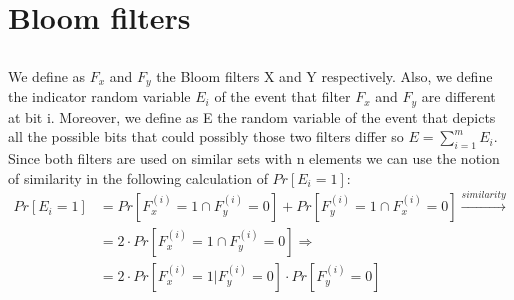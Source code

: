 \documentclass[11pt]{537homework}
\author{Emmanouil Kritharakis}
\begin{document}
\section{Bloom filters}
\subsection{}
We define as $F_x$ and $F_y$ the Bloom filters X and Y respectively. Also, we define the indicator random variable $E_i$ of the event that filter $F_x$ and $F_y$ are different at bit i. Moreover, we define as E the random variable of the event that depicts all the possible bits that could possibly those two filters differ so $E = \sum_{i=1}^{m} E_i$. Since both filters are used on similar sets with n elements we can use the notion of similarity in the following calculation of $Pr[E_i = 1]$:
\begin{align*}
    Pr[E_i = 1] &= Pr[F_x^{(i)} = 1 \cap F_y^{(i)} = 0]+Pr[F_y^{(i)} = 1 \cap F_x^{(i)} = 0] \xrightarrow{\textit{similarity}} \\
    &= 2 \cdot Pr[F_x^{(i)} = 1 \cap F_y^{(i)} = 0] \Longrightarrow \\
    &= 2 \cdot Pr[F_x^{(i)} = 1 | F_y^{(i)} = 0] \cdot Pr[F_y^{(i)} = 0]
\end{align*}
\end{document}
